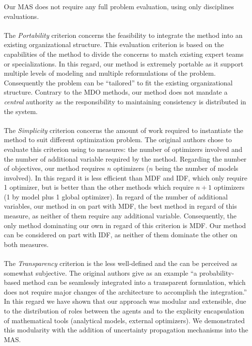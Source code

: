 Our MAS does not require any full problem evaluation, using only disciplines evaluations.
 
 \paragraph*{}
 The \emph{Portability} criterion concerns the feasibility to integrate the method into an existing organizational structure. This evaluation criterion is based on the capabilities of the method to divide the concerns to match existing expert teams or specializations. In this regard, our method is extremely portable as it support multiple levels of modeling and multiple reformulations of the problem. Consequently the problem can be \enquote{tailored} to fit the existing organizational structure. Contrary to the MDO methods, our method does not mandate a \emph{central} authority as the responsibility to maintaining consistency is distributed in the system.
  
 \paragraph*{}
  The \emph{Simplicity} criterion concerns the amount of work required to instantiate the method to suit different optimization problem. The original authors chose to evaluate this criterion using to measures: the number of optimizers involved and the number of additional variable required by the method. Regarding the number of objectives, our method requires $n$ optimizers ($n$ being the number of models involved). In this regard it is less efficient than MDF and IDF, which only require 1 optimizer, but is better than the other methods which require $n+1$ optimizers (1 by model plus 1 global optimizer). In regard of the number of additional variables, our method in on part with MDF, the best method in regard of this measure, as neither of them require any additional variable.
Consequently, the only method dominating our own in regard of this criterion is MDF. Our method can be considered on part with IDF, as neither of them dominate the other on both measures.  
  
 \paragraph*{}
 The \emph{Transparency} criterion is the less well-defined and the can be perceived as somewhat subjective. The original authors give as an example \enquote{a probability-based method can be seamlessly integrated into a transparent formulation, which does not require major changes of the architecture to accomplish the integration.} In this regard we have shown that our approach was modular and extensible, due to the distribution of roles between the agents and to the explicity encapsulation of mathematical tools (analytical models, external optimizers). We demonstrated this modularity with the addition of uncertainty propagation mechanisms into the MAS.
 
